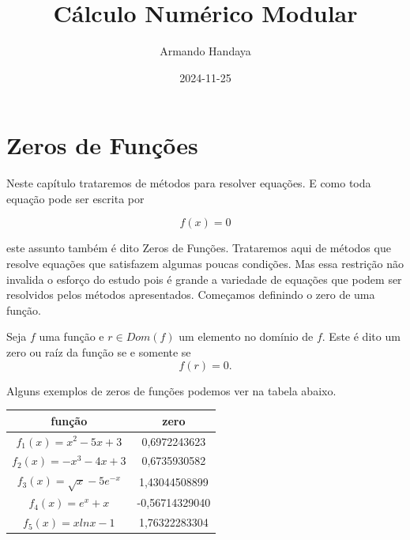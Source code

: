 \documentclass[
  letterpaper,
  DIV=11,
  numbers=noendperiod]{scrreprt}
\title{Cálculo Numérico Modular}
\author{Armando Handaya}
\date{2024-11-25}
\renewcommand*\contentsname{Table of contents}
\newcommand\contentsname{Table of contents}
\begin{document}
\maketitle

\renewcommand*\contentsname{Table of contents}
{
\hypersetup{linkcolor=}
\setcounter{tocdepth}{2}
\tableofcontents
}


\chapter{Zeros de Funções}\label{zeros-de-funuxe7uxf5es}

Neste capítulo trataremos de métodos para resolver equações. E como toda
equação pode ser escrita por

\[f(x)=0\]

este assunto também é dito Zeros de Funções. Trataremos aqui de métodos
que resolve equações que satisfazem algumas poucas condições. Mas essa
restrição não invalida o esforço do estudo pois é grande a variedade de
equações que podem ser resolvidos pelos métodos apresentados. Começamos
definindo o zero de uma função.

\begin{tcolorbox}[enhanced jigsaw, toptitle=1mm, opacitybacktitle=0.6, arc=.35mm, breakable, left=2mm, leftrule=.75mm, title=\textcolor{quarto-callout-note-color}{\faInfo}\hspace{0.5em}{Zero/Raíz}, coltitle=black, colback=white, rightrule=.15mm, colframe=quarto-callout-note-color-frame, titlerule=0mm, bottomtitle=1mm, bottomrule=.15mm, toprule=.15mm, colbacktitle=quarto-callout-note-color!10!white, opacityback=0]

Seja \(f\) uma função e \(r\in Dom(f)\) um elemento no domínio de \(f\).
Este é dito um zero ou raíz da função se e somente se \[f(r)=0.\]

\end{tcolorbox}

Alguns exemplos de zeros de funções podemos ver na tabela abaixo.

\begin{longtable}[]{@{}cc@{}}
\toprule\noalign{}
função & zero \\
\midrule\noalign{}
\endhead
\bottomrule\noalign{}
\endlastfoot
\(f_1(x)=x^2-5x+3\) & 0,6972243623 \\
\(f_2(x)=-x^3-4x+3\) & 0,6735930582 \\
\(f_3(x)=\sqrt{x}-5e^{-x}\) & 1,43044508899 \\
\(f_4(x)=e^x+x\) & -0,56714329040 \\
\(f_5(x)=x lnx-1\) & 1,76322283304 \\
\end{longtable}
\end{document}
